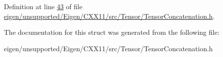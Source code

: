 Definition at line \hyperlink{eigen_2unsupported_2_eigen_2_c_x_x11_2src_2_tensor_2_tensor_concatenation_8h_source_l00043}{43} of file \hyperlink{eigen_2unsupported_2_eigen_2_c_x_x11_2src_2_tensor_2_tensor_concatenation_8h_source}{eigen/unsupported/\+Eigen/\+C\+X\+X11/src/\+Tensor/\+Tensor\+Concatenation.\+h}.



The documentation for this struct was generated from the following file\+:\begin{DoxyCompactItemize}
\item 
eigen/unsupported/\+Eigen/\+C\+X\+X11/src/\+Tensor/\+Tensor\+Concatenation.\+h\end{DoxyCompactItemize}
